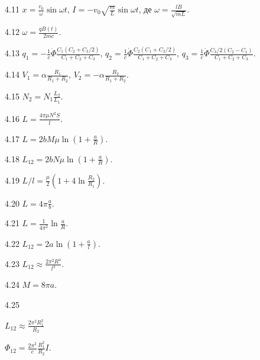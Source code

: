 \begin{Solution}{4.{11}}
	$x = \frac{v_0}{\omega}\sin\omega t$,
	$I = -v_0\sqrt{\frac{m}{L}}\sin\omega t$,
	де $\omega = \frac{lB}{\sqrt{mL}}$.
\end{Solution}
\begin{Solution}{4.{12}}
	$\omega = \frac{qB(t)}{2mc}$.
\end{Solution}
\begin{Solution}{4.{13}}
	$q_1 = - \frac1c \dot{\Phi}\frac{C_1(C_2 + C_3/2)}{C_1 + C_2 +C_3}$, $q_2 =  \frac1c \dot{\Phi}\frac{C_2(C_1 + C_3/2)}{C_1 + C_2 +C_3}$, $q_3 =  \frac1c \dot{\Phi}\frac{C_3/2(C_2 - C_1)}{C_1 + C_2 +C_3}$.
\end{Solution}
\begin{Solution}{4.{14}}
	$V_1 = \alpha \frac{R_1}{R_1 + R_2}$, $V_2 = - \alpha \frac{R_2}{R_1 + R_2}$.
\end{Solution}
\begin{Solution}{4.{15}}
$N_2 = N_1 \frac{L_2}{L_1}$.
\end{Solution}
\begin{Solution}{4.{16}}
	$L = \frac{4\pi\mu N^2 S}{l}$.
\end{Solution}
\begin{Solution}{4.{17}}
	$L  = 2bM\mu\ln\left( 1 + \frac{a}{R}\right) $.
\end{Solution}
\begin{Solution}{4.{18}}
	$L_{12} = 2bN\mu \ln\left( 1 + \frac{a}{R}\right) $.
\end{Solution}
\begin{Solution}{4.{19}}
	$L/l = \frac{\mu}{2} \left( 1 + 4\ln\frac{R_2}{R_1}\right)$.
\end{Solution}
\begin{Solution}{4.{20}}
	$L = 4\pi\frac{a}{b}$.
\end{Solution}
\begin{Solution}{4.{21}}
	$L = \frac{1}{4\pi^2}\ln\frac{a}{R}$.
\end{Solution}
\begin{Solution}{4.{22}}
	$L_{12} = 2a\ln\left( 1 + \frac{a}{l}\right).$
\end{Solution}
\begin{Solution}{4.{23}}
	$L_{12} \approx \frac{2\pi^2R^4}{l^3}$.
\end{Solution}
\begin{Solution}{4.{24}}
	$M = 8\pi a$.
\end{Solution}
\begin{Solution}{4.{25}}
		\begin{enumerate*}[label=\alph*)]
		\item $L_{12} \approx \frac{2\pi^2R_1^2}{R_2}$
		\item $\Phi_{12} = \frac{2\pi^2}{c} \frac{R_1^2}{R_2} I$.
		\end{enumerate*}
\end{Solution}
